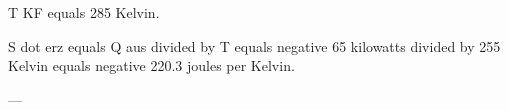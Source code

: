 T KF equals 285 Kelvin.  

S dot erz equals Q aus divided by T equals negative 65 kilowatts divided by 255 Kelvin equals negative 220.3 joules per Kelvin.  

---